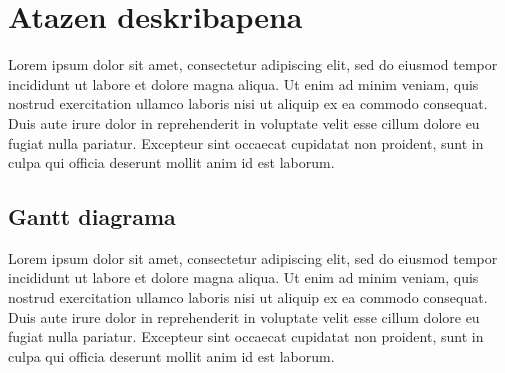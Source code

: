 \chapter{Atazen deskribapena}

Lorem ipsum dolor sit amet, consectetur adipiscing elit, sed do eiusmod tempor incididunt ut labore et dolore magna aliqua. Ut enim ad minim veniam, quis nostrud exercitation ullamco laboris nisi ut aliquip ex ea commodo consequat. Duis aute irure dolor in reprehenderit in voluptate velit esse cillum dolore eu fugiat nulla pariatur. Excepteur sint occaecat cupidatat non proident, sunt in culpa qui officia deserunt mollit anim id est laborum.

\section{Gantt diagrama}

Lorem ipsum dolor sit amet, consectetur adipiscing elit, sed do eiusmod tempor incididunt ut labore et dolore magna aliqua. Ut enim ad minim veniam, quis nostrud exercitation ullamco laboris nisi ut aliquip ex ea commodo consequat. Duis aute irure dolor in reprehenderit in voluptate velit esse cillum dolore eu fugiat nulla pariatur. Excepteur sint occaecat cupidatat non proident, sunt in culpa qui officia deserunt mollit anim id est laborum.